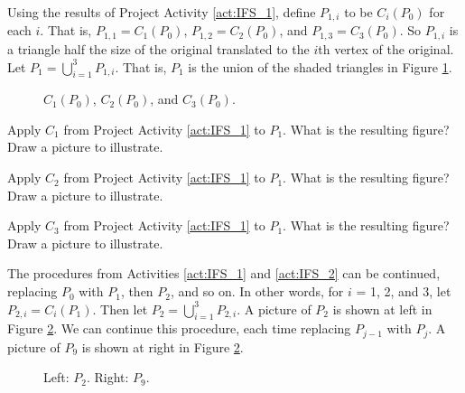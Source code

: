 \begin{pactivity} \label{act:IFS_2}  Using the results of Project Activity \ref{act:IFS_1}, define $P_{1,i}$ to be $C_i(P_0)$ for each $i$. That is, $P_{1,1} = C_1(P_0)$, $P_{1,2} = C_2(P_0)$, and $P_{1,3} = C_3(P_0)$. So $P_{1,i}$ is a triangle half the size of the original translated to the $i$th vertex of the original. Let $P_1 = \bigcup_{i=1}^3 P_{1,i}$. That is, $P_1$ is the union of the shaded triangles in Figure \ref{F:IFS_2}. 
\begin{figure}[h]
\begin{center}
\caption{$C_1(P_0)$, $C_2(P_0)$, and $C_3(P_0)$.}
\label{F:IFS_2}
\end{center}
\end{figure}
\ba
\item Apply $C_1$ from Project Activity \ref{act:IFS_1} to $P_1$. What is the resulting figure? Draw a picture to illustrate.

\item Apply $C_2$ from Project Activity \ref{act:IFS_1} to $P_1$. What is the resulting figure? Draw a picture to illustrate.


\item Apply $C_3$ from Project Activity \ref{act:IFS_1} to $P_1$. What is the resulting figure? Draw a picture to illustrate.

\ea

\end{pactivity}

The procedures from Activities \ref{act:IFS_1} and \ref{act:IFS_2} can be continued, replacing $P_0$ with $P_1$, then $P_2$, and so on. In other words, for $i$ = 1, 2, and 3, let $P_{2,i} = C_i(P_1)$. Then let $P_2 = \bigcup_{i=1}^3 P_{2,i}$. A picture of $P_2$ is shown at left in Figure \ref{F:Striangle_2}. We can continue this procedure, each time replacing $P_{j-1}$ with $P_j$. A picture of $P_9$ is shown at right in Figure \ref{F:Striangle_2}.  
\begin{figure}[h]
\begin{center}
 \hspace{0.5in} 
\caption{Left: $P_2$. Right: $P_9$.}
\label{F:Striangle_2}
\end{center}
\end{figure}


